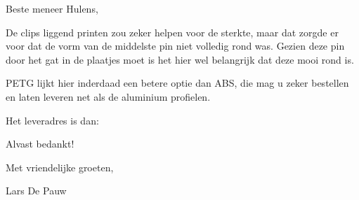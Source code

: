\documentclass{scrartcl}
\begin{document}
Beste meneer Hulens,

 

De clips liggend printen zou zeker helpen voor de sterkte, maar dat zorgde er voor dat de vorm van de middelste pin niet volledig rond was. Gezien deze pin door het gat in de plaatjes moet is het hier wel belangrijk dat deze mooi rond is.

 

PETG lijkt hier inderdaad een betere optie dan ABS, die mag u zeker bestellen en laten leveren net als de aluminium profielen.

 

Het leveradres is dan:



 

Alvast bedankt!

Met vriendelijke groeten,

 

Lars De Pauw
\end{document}
